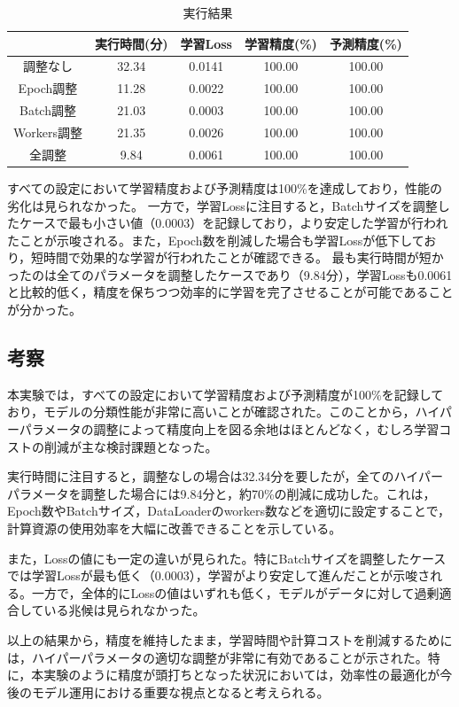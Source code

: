 \documentclass[a4paper,11pt,titlepage]{jsarticle}
\begin{document}
\begin{table}[httb]
\centering
\caption{実行結果}
\label{hyper result}
\begin{tabular}{|c|c|c|c|c|}
\hline
&実行時間(分)&学習Loss&学習精度(\%)&予測精度(\%)\\
\hline
調整なし&32.34&0.0141&100.00&100.00\\
\hline
Epoch調整&11.28&0.0022&100.00&100.00\\
\hline
Batch調整&21.03&0.0003&100.00&100.00\\
\hline
Workers調整&21.35&0.0026&100.00&100.00\\
\hline
全調整&9.84&0.0061&100.00&100.00\\
\hline
\end{tabular}
\end{table}

すべての設定において学習精度および予測精度は100\%を達成しており，性能の劣化は見られなかった。
一方で，学習Lossに注目すると，Batchサイズを調整したケースで最も小さい値（0.0003）を記録しており，より安定した学習が行われたことが示唆される。また，Epoch数を削減した場合も学習Lossが低下しており，短時間で効果的な学習が行われたことが確認できる。
最も実行時間が短かったのは全てのパラメータを調整したケースであり（9.84分），学習Lossも0.0061と比較的低く，精度を保ちつつ効率的に学習を完了させることが可能であることが分かった。

\subsection{考察}
本実験では，すべての設定において学習精度および予測精度が100\%を記録しており，モデルの分類性能が非常に高いことが確認された。このことから，ハイパーパラメータの調整によって精度向上を図る余地はほとんどなく，むしろ学習コストの削減が主な検討課題となった。

実行時間に注目すると，調整なしの場合は32.34分を要したが，全てのハイパーパラメータを調整した場合には9.84分と，約70\%の削減に成功した。これは，Epoch数やBatchサイズ，DataLoaderのworkers数などを適切に設定することで，計算資源の使用効率を大幅に改善できることを示している。

また，Lossの値にも一定の違いが見られた。特にBatchサイズを調整したケースでは学習Lossが最も低く（0.0003），学習がより安定して進んだことが示唆される。一方で，全体的にLossの値はいずれも低く，モデルがデータに対して過剰適合している兆候は見られなかった。

以上の結果から，精度を維持したまま，学習時間や計算コストを削減するためには，ハイパーパラメータの適切な調整が非常に有効であることが示された。特に，本実験のように精度が頭打ちとなった状況においては，効率性の最適化が今後のモデル運用における重要な視点となると考えられる。
\end{document}
